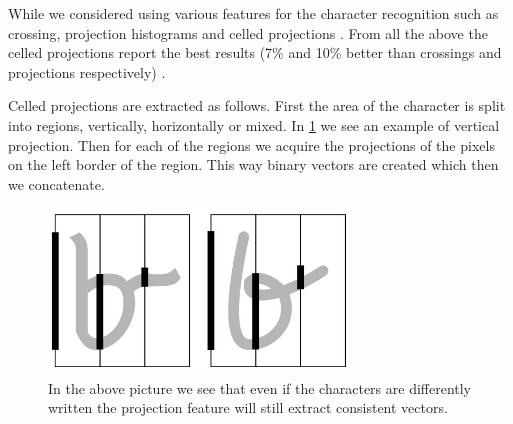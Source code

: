While we considered using various features for the character recognition such as crossing, projection histograms and celled projections \cite{HWR:features1}\cite{HWR:features2}. From all the above the celled projections report the best results (7\% and 10\% better than crossings and projections respectively) \cite{HWR:features1}.

Celled projections are extracted as follows. First the area of the character is split into regions, vertically, horizontally or mixed. In \ref{fig:method:features:feature} we see an example of vertical projection. Then for each of the regions we acquire the projections of the pixels on the left border of the region. This way binary vectors are created which then we concatenate.

\begin{figure}[ht]
	\label{fig:method:features:feature}
	\includegraphics[width=8cm]{shared/img/projection_letter.jpg}
	\caption{In the above picture we see that even if the characters are differently written the projection feature will still extract consistent vectors.}
\end{figure}